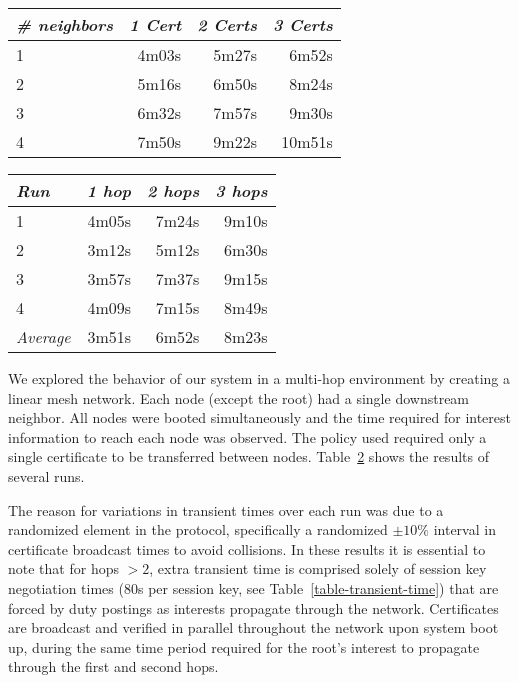 \begin{table}[tbhp]
  \newcommand\T{\rule{0pt}{2.1ex}}
  {
  \begin{minipage}{.5\linewidth}
    \centering
    {
    \begin{tabular}{|l|r|r|r|} \hline
      \textit{\# neighbors} \T & \textit{1 Cert }
                               & \textit{2 Certs}
                               & \textit{3 Certs} \\ \hline \hline

      1 \T &  4m03s & 5m27s &  6m52s \\ \hline
      2 \T &  5m16s & 6m50s &  8m24s \\ \hline
      3 \T &  6m32s & 7m57s &  9m30s \\ \hline
      4 \T &  7m50s & 9m22s & 10m51s \\ \hline
    \end{tabular}
    }
    \label{table-one-hop-transient}
  \end{minipage}%
  \begin{minipage}{.5\linewidth}
    \centering
    {
    \begin{tabular}{|l|r|r|r|} \hline
      \textit{Run} \T & \textit{1 hop }
                      & \textit{2 hops}
                      & \textit{3 hops} \\ \hline \hline

      1 \T &  4m05s & 7m24s & 9m10s \\ \hline
      2 \T &  3m12s & 5m12s & 6m30s \\ \hline
      3 \T &  3m57s & 7m37s & 9m15s \\ \hline
      4 \T &  4m09s & 7m15s & 8m49s \\ \hline
      \textit{Average} \T &  3m51s & 6m52s & 8m23s \\ \hline
    \end{tabular}
    }
    \label{table-multi-hop-transient}
  \end{minipage}
  }
\end{table}

We explored the behavior of our system in a multi-hop environment by
creating a linear mesh network. Each node (except the root) had a single
downstream neighbor. All nodes were booted simultaneously and the time
required for interest information to reach each node was observed. The
policy used required only a single certificate to be transferred between
nodes. Table~\ref{table-multi-hop-transient} shows the results of
several runs.

The reason for variations in transient times over each run was due to a
randomized element in the protocol, specifically a randomized $\pm 10\%$
interval in certificate broadcast times to avoid collisions. In these
results it is essential to note that for hops $> 2$, extra transient
time is comprised solely of session key negotiation times (80s per
session key, see Table~\ref{table-transient-time}) that are forced by
duty postings as interests propagate through the network. Certificates
are broadcast and verified in parallel throughout the network upon
system boot up, during the same time period required for the root's
interest to propagate through the first and second hops.
